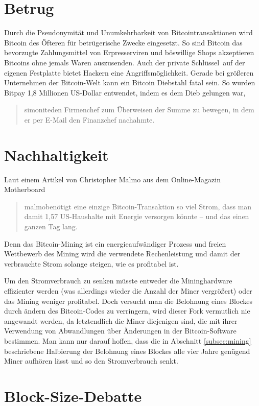 \section{Betrug}

Durch die Pseudonymität und Unumkehrbarkeit von Bitcointransaktionen wird Bitcoin des Öfteren für betrügerische Zwecke eingesetzt.
So sind Bitcoin das bevorzugte Zahlungsmittel von Erpresserviren und böswillige Shops akzeptieren Bitcoins ohne jemals Waren auszusenden.
Auch der private Schlüssel auf der eigenen Festplatte bietet Hackern eine Angriffsmöglichkeit.
Gerade bei größeren Unternehmen der Bitcoin-Welt kann ein Bitcoin Diebstahl fatal sein.
So wurden Bitpay 1,8 Millionen US-Dollar entwendet, indem es dem Dieb gelungen war, \begin{quote}{simonite}den Firmenchef zum Überweisen der Summe zu bewegen, in dem er per E-Mail den Finanzchef nachahmte.\end{quote}

\section{Nachhaltigkeit}

Laut einem Artikel von Christopher Malmo aus dem Online-Magazin Motherboard \begin{quote}{malmo}benötigt eine einzige Bitcoin-Transaktion so viel Strom, dass man damit 1,57 US-Haushalte mit Energie versorgen könnte -- und das einen ganzen Tag lang.\end{quote}
Denn das Bitcoin-Mining ist ein energieaufwändiger Prozess und freien Wettbewerb des Mining wird die verwendete Rechenleistung und damit der verbrauchte Strom solange steigen, wie es profitabel ist.

Um den Stromverbrauch zu senken müsste entweder die Mininghardware effizienter werden (was allerdings wieder die Anzahl der Miner vergrößert) oder das Mining weniger profitabel.
Doch versucht man die Belohnung eines Blockes durch ändern des Bitcoin-Codes zu verringern, wird dieser Fork vermutlich nie angewandt werden, da letztendlich die Miner diejenigen sind, die mit ihrer Verwendung von Abwandlungen über Änderungen in der Bitcoin-Software bestimmen.
Man kann nur darauf hoffen, dass die in Abschnitt \ref{subsec:mining} beschriebene Halbierung der Belohnung eines Blockes alle vier Jahre genügend Miner aufhören lässt und so den Stromverbrauch senkt.

\section{Block-Size-Debatte}

